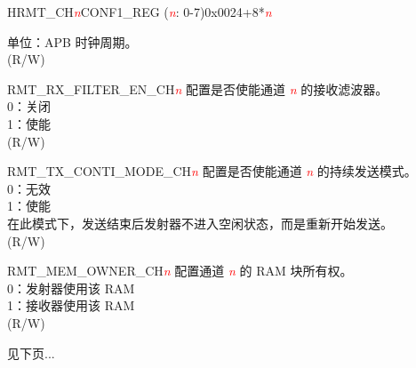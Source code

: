 \begin{register}{H}{RMT\_CH\textcolor{red}{\it{n}}CONF1\_REG (\textcolor{red}{\it{n}}: 0-7)}{0x0024+8*\textcolor{red}{\it{n}}}
\begin{regdesc}
\begin{reglist}
单位：APB 时钟周期。\\(R/W)
\item [RMT\_RX\_FILTER\_EN\_CH\textcolor{red}{\it{n}}] 配置是否使能通道 \textcolor{red}{\it{n}} 的接收滤波器。\\
0：关闭\\
1：使能\\(R/W)
\item [RMT\_TX\_CONTI\_MODE\_CH\textcolor{red}{\it{n}}] 配置是否使能通道 \textcolor{red}{\it{n}} 的持续发送模式。\\
0：无效\\
1：使能\\
在此模式下，发送结束后发射器不进入空闲状态，而是重新开始发送。\\(R/W)
\item [RMT\_MEM\_OWNER\_CH\textcolor{red}{\it{n}}] 配置通道 \textcolor{red}{\it{n}} 的 RAM 块所有权。\\
0：发射器使用该 RAM\\
1：接收器使用该 RAM\\(R/W)

\item [见下页...]
\end{reglist}\end{regdesc}
\end{register}
\addtocounter{Regfloat}{-1}
